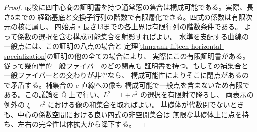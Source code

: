 \begin{proof}
最後に四中心商の証明書を持つ通常窓の集合は構成可能である。実際、長さ5までの
経路基底と交換子行列の階数で有限層化できる。四式の係数は有限次元の核に属し、
四始点・長さ13までの各上界は有限行列の階数条件である。
よって係数の選択を含む構成可能集合を射影すればよい。
水準を支配する曲線の一般点には、この証明の八点の場合と
定理\ref{thm:rank-fifteen-horizontal-specialization}の証明の他の全ての場合により、
実際にこの有限証明書がある。従って幾何学的一般ファイバーのどの閉点も
証明書を持つ。もしその補集合と一般ファイバーとの交わりが非空なら、
構成可能性によりそこに閉点があるので矛盾する。補集合の $c$ 直線への像も
構成可能で一般点を含まないため有限である。この議論を
$\overline{\mathbb Q}$ 上で行い、$L^2=1+c^2$ の選択を有限射で降ろし、
両表示の例外の $\xi=c^2$ における像の和集合を取ればよい。
基礎体が代数閉でないときも、中心の係数空間における良い四式の非空開集合は
無限な基礎体上に点を持ち、左右の完全性は体拡大から降下する。
\end{proof}

